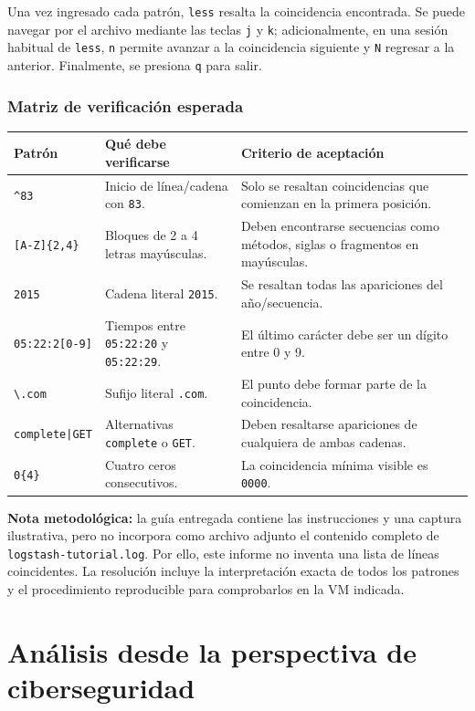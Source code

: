 \documentclass[11pt,a4paper]{article}
\newcommand{\regex}[1]{\texttt{#1}}
\begin{document}
Una vez ingresado cada patrón, \texttt{less} resalta la coincidencia encontrada. Se puede navegar por el archivo mediante las teclas \texttt{j} y \texttt{k}; adicionalmente, en una sesión habitual de \texttt{less}, \texttt{n} permite avanzar a la coincidencia siguiente y \texttt{N} regresar a la anterior. Finalmente, se presiona \texttt{q} para salir.

\subsubsection{Matriz de verificación esperada}

\begin{tabularx}{\textwidth}{p{} X X}
\toprule
\textbf{Patrón} & \textbf{Qué debe verificarse} & \textbf{Criterio de aceptación} \\
\midrule
\regex{\string^83} & Inicio de línea/cadena con \texttt{83}. & Solo se resaltan coincidencias que comienzan en la primera posición. \\
\regex{[A-Z]\{2,4\}} & Bloques de 2 a 4 letras mayúsculas. & Deben encontrarse secuencias como métodos, siglas o fragmentos en mayúsculas. \\
\regex{2015} & Cadena literal \texttt{2015}. & Se resaltan todas las apariciones del año/secuencia. \\
\regex{05:22:2[0-9]} & Tiempos entre \texttt{05:22:20} y \texttt{05:22:29}. & El último carácter debe ser un dígito entre 0 y 9. \\
\regex{\textbackslash .com} & Sufijo literal \texttt{.com}. & El punto debe formar parte de la coincidencia. \\
\regex{complete|GET} & Alternativas \texttt{complete} o \texttt{GET}. & Deben resaltarse apariciones de cualquiera de ambas cadenas. \\
\regex{0\{4\}} & Cuatro ceros consecutivos. & La coincidencia mínima visible es \texttt{0000}. \\
\bottomrule
\end{tabularx}

\textbf{Nota metodológica:} la guía entregada contiene las instrucciones y una captura ilustrativa, pero no incorpora como archivo adjunto el contenido completo de \texttt{logstash-tutorial.log}. Por ello, este informe no inventa una lista de líneas coincidentes. La resolución incluye la interpretación exacta de todos los patrones y el procedimiento reproducible para comprobarlos en la VM indicada.

\section{Análisis desde la perspectiva de ciberseguridad}
\end{document}
